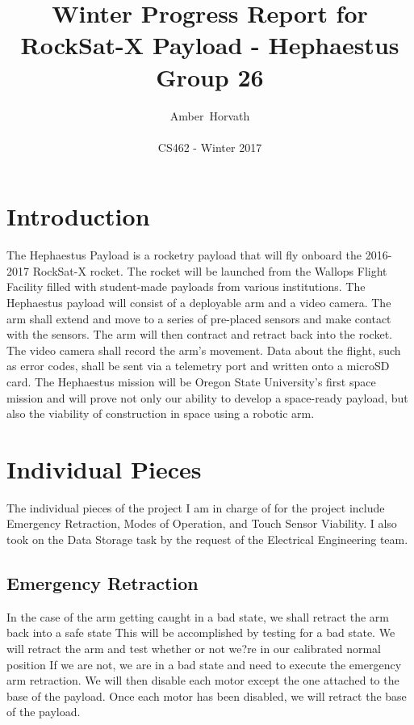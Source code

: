 \documentclass[letterpaper,10pt]{article}
\title{Winter Progress Report for RockSat-X Payload - Hephaestus \\ Group 26}
\author{Amber~Horvath\\ \\ CS462 - Winter 2017}
\begin{document}
\maketitle

\section{Introduction}
The Hephaestus Payload is a rocketry payload that will fly onboard the 2016-2017 RockSat-X rocket. 
The rocket will be launched from the Wallops Flight Facility filled with student-made payloads from 
various institutions. The Hephaestus payload will consist of a deployable arm and a video camera.
The arm shall extend and move to a series of pre-placed sensors and make contact with the sensors. 
The arm will then contract and retract back into the rocket.
The video camera shall record the arm's movement. Data about the flight, such as error codes, shall be 
sent via a telemetry port and written onto a microSD card.
The Hephaestus mission will be Oregon State University's first space mission and will prove not only
our ability to develop a space-ready payload, but also the viability of construction in space using a robotic
arm.
\section{Individual Pieces}
The individual pieces of the project I am in charge of for the project include Emergency Retraction, 
Modes of Operation, and Touch Sensor Viability. I also took on the Data Storage task by the request
of the Electrical Engineering team.
\subsection{Emergency Retraction}
In the case of the arm getting caught in a bad state, we shall retract the arm back into a safe state
This will be accomplished by testing for a bad state.
We will retract the arm and test whether or not we?re in our calibrated normal position
If we are not, we are in a bad state and need to execute the emergency arm retraction.
We will then disable each motor except the one attached to the base of the payload.
Once each motor has been disabled, we will retract the base of the payload.
\end{document}

